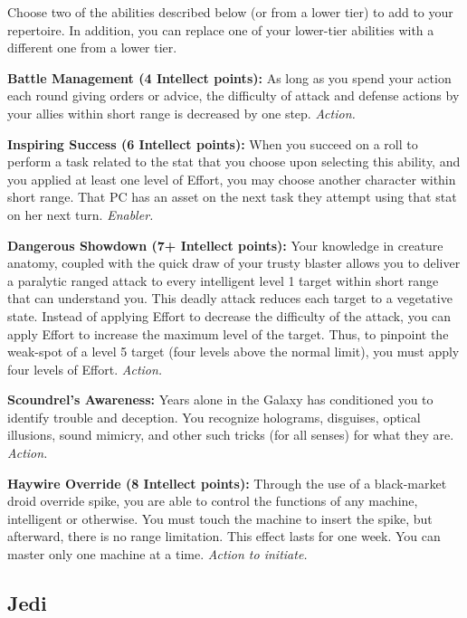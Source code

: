 \documentclass[a4paper,10pt,final,twocolumn,oneside]{book}
\newcommand{\itemAbility}[2]{\textcolor{25gray}{\textbullet\textbf{ #1:}}{ #2}\par}
\newcommand{\enabler}{\textit{ Enabler.}}
\newcommand{\action}{\textit{ Action.}}
\newcommand{\actionInit}{\textit{ Action to initiate.}}
\begin{document}
Choose two of the abilities described below (or from a lower tier) to add to your repertoire. In addition, you can replace one of your lower-tier abilities with a different one from a lower tier.

\itemAbility{Battle Management (4 Intellect points)}{As long as you spend your action each round giving orders or advice, the difficulty of attack and defense actions by your allies within short range is decreased by one step.\action}

\itemAbility{Inspiring Success (6 Intellect points)}{When you succeed on a roll to perform a task related to the stat that you choose upon selecting this ability, and you applied at least one level of Effort, you may choose another character within short range. That PC has an asset on the next task they attempt using that stat on her next turn.\enabler}

\itemAbility{Dangerous Showdown (7+ Intellect points)}{Your knowledge in creature anatomy, coupled with the quick draw of your trusty blaster allows you to deliver a paralytic ranged attack to every intelligent level 1 target within short range that can understand you. This deadly attack reduces each target to a vegetative state. Instead of applying Effort to decrease the difficulty of the attack, you can apply Effort to increase the maximum level of the target. Thus, to pinpoint the weak-spot of a level 5 target (four levels above the normal limit), you must apply four levels of Effort.\action}

\itemAbility{Scoundrel's Awareness}{Years alone in the Galaxy has conditioned you to identify trouble and deception. You recognize holograms, disguises, optical illusions, sound mimicry, and other such tricks (for all senses) for what they are.\action}

\itemAbility{Haywire Override (8 Intellect points)}{ Through the use of a black-market droid override spike, you are able to control the functions of any machine, intelligent or otherwise. You must touch the machine to insert the spike, but afterward, there is no range limitation. This effect lasts for one week. You can master only one machine at a time.\actionInit}


\clearpage

%
%
%
%
%
%
%
%
%
%
%
%
%
%
%
%
%
%
%


\subsection{Jedi} %
\label{sub:jedi}
\end{document}
